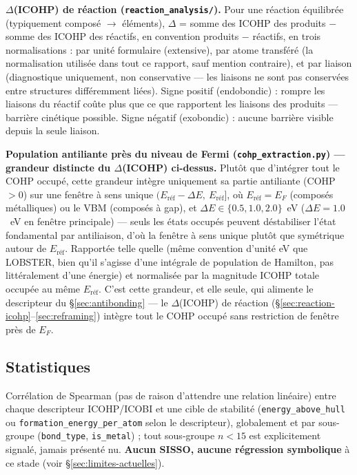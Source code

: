 \documentclass[11pt,a4paper]{article}
\begin{document}
\textbf{$\Delta$(ICOHP) de réaction (\texttt{reaction\_analysis/}).} Pour
une réaction équilibrée (typiquement composé $\to$ éléments), $\Delta$ =
somme des ICOHP des produits $-$ somme des ICOHP des réactifs, en
convention \og{}produits $-$ réactifs\fg{}, en trois normalisations : par
unité formulaire (extensive), par atome transféré (la normalisation
utilisée dans tout ce rapport, sauf mention contraire), et par liaison
(diagnostique uniquement, non conservative --- les liaisons ne sont pas
conservées entre structures différemment liées). Signe positif
(\og{}endobondic\fg{}) : rompre les liaisons du réactif coûte plus que ce
que rapportent les liaisons des produits --- barrière cinétique
possible. Signe négatif (\og{}exobondic\fg{}) : aucune barrière visible
depuis la seule liaison.

\textbf{Population antiliante près du niveau de Fermi
(\texttt{cohp\_extraction.py}) --- grandeur distincte du $\Delta$(ICOHP)
ci-dessus.} Plutôt que d'intégrer tout le COHP occupé, cette grandeur
intègre uniquement sa partie antiliante (COHP$>0$) sur une fenêtre à
sens unique $(E_\text{réf}-\Delta E,\ E_\text{réf}]$, où
$E_\text{réf}=E_F$ (composés métalliques) ou le VBM (composés à gap), et
$\Delta E \in \{0.5, 1.0, 2.0\}$~eV ($\Delta E=1.0$~eV en fenêtre
principale) --- seuls les états occupés peuvent déstabiliser l'état
fondamental par antiliaison, d'où la fenêtre à sens unique plutôt que
symétrique autour de $E_\text{réf}$. Rapportée telle quelle (même
convention d'unité \og{}eV\fg{} que LOBSTER, bien qu'il s'agisse d'une
intégrale de population de Hamilton, pas littéralement d'une énergie) et
normalisée par la magnitude ICOHP totale occupée au même $E_\text{réf}$.
C'est cette grandeur, et elle seule, qui alimente le descripteur du
\S\ref{sec:antibonding} --- le $\Delta$(ICOHP) de réaction
(\S\ref{sec:reaction-icohp}--\ref{sec:reframing}) intègre tout le COHP
occupé sans restriction de fenêtre près de $E_F$.

\subsection{Statistiques}

Corrélation de Spearman (pas de raison d'attendre une relation linéaire)
entre chaque descripteur ICOHP/ICOBI et une cible de stabilité
(\texttt{energy\_above\_hull} ou \texttt{formation\_energy\_per\_atom}
selon le descripteur), globalement et par sous-groupe (\texttt{bond\_type},
\texttt{is\_metal}) ; tout sous-groupe $n<15$ est explicitement signalé,
jamais présenté nu. \textbf{Aucun SISSO, aucune régression symbolique} à
ce stade (voir \S\ref{sec:limites-actuelles}).
\end{document}
